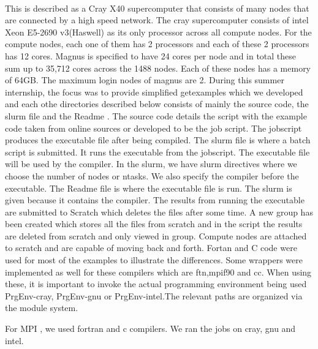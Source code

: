 \begin{Document}
{\begin{scope}
\end{scope}
\


This is described as a Cray X40 supercomputer that consists of many nodes that are connected by a high speed network. The cray supercomputer consists of intel Xeon E5-2690 v3(Haswell) as its only processor across all compute nodes. For the compute nodes, each one of them has 2 processors and each of these 2 processors has 12 cores.
Magnus is specified to have 24 cores per node and in total these sum up to 35,712 cores across the 1488 nodes. Each of these nodes has a memory of 64GB. The maximum login nodes of magnus are 2.
During this summer internship, the focus was to provide simplified getexamples which we developed and each othe directories described below consists of mainly the source code, the slurm file and the Readme . The source code details the script with the example code taken from online sources or developed to be the job script. The jobscript produces the executable file after being compiled. The slurm file is where a batch script is submitted. It runs the executable from the jobscript. The executable file will be used by the compiler. In the slurm, we have slurm directives where we choose the number of nodes or ntasks. We also specify the compiler before the executable. The Readme file is where the executable file is run. The slurm is given because it contains the compiler. The results from running the executable are submitted to Scratch which deletes the files after some time. A new group has been created which stores all the files from scratch and in the script the results are deleted from scratch and only viewed in group. Compute nodes are attached to scratch and are capable of moving back and forth.
Fortan and C code were used for most of the examples to illustrate the differences. Some wrappers were implemented as well for these compilers which are ftn,mpif90 and cc. When using these, it is important to invoke the actual programming environment being used PrgEnv-cray, PrgEnv-gnu or PrgEnv-intel.The relevant paths are organized via the module system.




For MPI , we used fortran and c compilers. We ran the jobs on cray, gnu and intel.








}
\end{Document}
